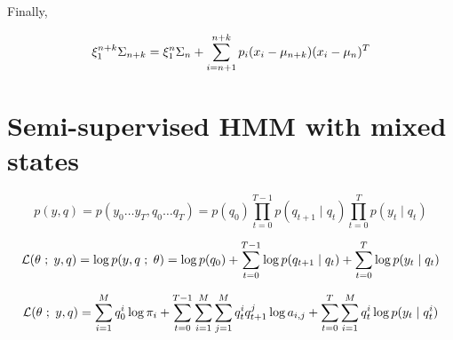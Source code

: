 \documentclass[a4paper, 11pt]{article}
\newcommand{\ssemi}{\hspace{.3em};\hspace{.3em}}
\begin{document}
Finally,
\begin{framed}
\begin{displaymath}
  \xi_{1}^{n + k} \Sigma_{n + k}
  = \xi_{1}^{n} \Sigma_{n} +
  \sum_{i = n+1}^{n+k} p_i (x_i - \mu_{n+k}) (x_i - \mu_{n})^T \\
\end{displaymath}
\end{framed}





\section{Semi-supervised HMM with mixed states}

\begin{displaymath}
  p(y, q) = p(y_0 \dots y_T, q_0 \dots q_T) = p(q_0) \prod_{t = 0}^{T-1} p(q_{t+1} \mid q_t) \prod_{t = 0}^{T} p(y_t \mid q_t)
\end{displaymath}

\begin{displaymath}
  \mathcal{L}(\theta \ssemi y, q) = \log{p(y, q \ssemi \theta)} = \log{p(q_0)} + \sum_{t = 0}^{T-1} \log{p(q_{t+1} \mid q_t)} + \sum_{t = 0}^{T} \log{ p(y_t \mid q_t) }
\end{displaymath}

\begin{displaymath}
  \mathcal{L}(\theta \ssemi y, q) = \sum_{i = 1}^{M} q_0^i \log{\pi_i} + \sum_{t = 0}^{T-1} \sum_{i = 1}^{M} \sum_{j = 1}^{M} q_t^i q_{t+1}^j \log{a_{i,j}} + \sum_{t = 0}^{T} \sum_{i = 1}^{M} q_t^i \log{ p(y_t \mid q_t^i) }
\end{displaymath}
\end{document}
